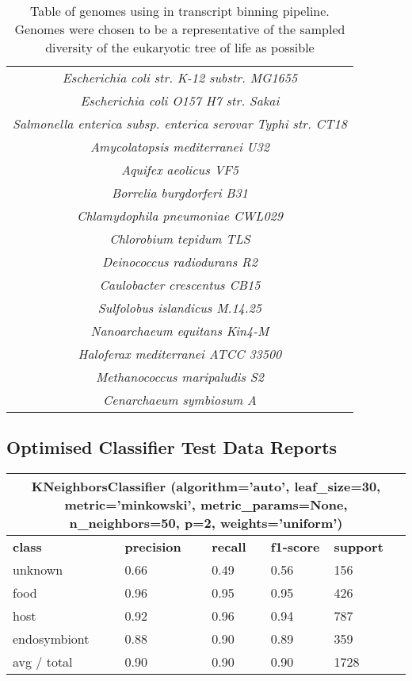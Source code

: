 \begin{table}
\begin{tabular}{|c|}
		\textit{Escherichia coli str. K-12 substr. MG1655}\\
		\textit{Escherichia coli O157 H7 str. Sakai}\\
		\textit{Salmonella enterica subsp. enterica serovar Typhi str. CT18}\\
		\textit{Amycolatopsis mediterranei U32}\\
		\textit{Aquifex aeolicus VF5}\\
		\textit{Borrelia burgdorferi B31}\\
		\textit{Chlamydophila pneumoniae CWL029}\\
		\textit{Chlorobium tepidum TLS}\\
		\textit{Deinococcus radiodurans R2}\\
		\textit{Caulobacter crescentus CB15}\\
		\textit{Sulfolobus islandicus M.14.25}\\
		\textit{Nanoarchaeum equitans Kin4-M}\\
		\textit{Haloferax mediterranei ATCC 33500}\\
		\textit{Methanococcus maripaludis S2}\\
		\textit{Cenarchaeum symbiosum A}\\
	\hline
	\end{tabular}
	\caption{Table of genomes using in transcript binning pipeline.
		Genomes were chosen to be a representative of the sampled diversity of the 
		eukaryotic tree of life as possible}
	\label{tab:appen_genomes}
\end{table}

\subsection{Optimised Classifier Test Data Reports}
\begin{table}
\begin{tabularx}{\textwidth}{|X|X|X|X|X|}
\hline
\multicolumn{5}{c}{KNeighborsClassifier (algorithm='auto', leaf\_size=30, metric='minkowski', metric\_params=None, n\_neighbors=50, p=2, weights='uniform')} \\
\hline
\textbf{class}		& \textbf{precision}  &  \textbf{recall}  & \textbf{f1-score}  &  \textbf{support} \\
unknown   	&    0.66 	 &   0.49   &    0.56   &   156   \\
food      	&    0.96 	 &   0.95   &    0.95   &   426   \\
host      	&    0.92    &   0.96   &    0.94   &   787   \\
endosymbiont&    0.88    &   0.90   &    0.89   &   359   \\
\hline
avg / total &    0.90    &   0.90   &    0.90   &   1728  \\
\hline
\end{tabularx}
\end{table}

